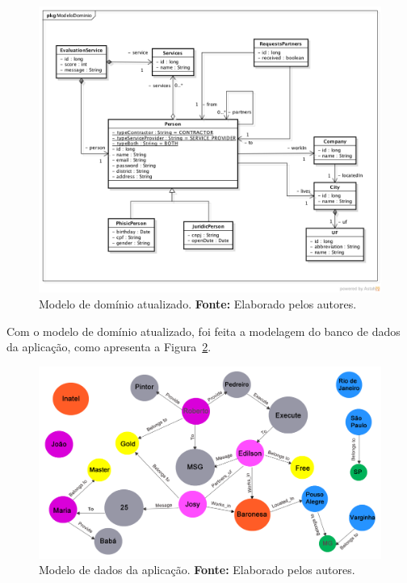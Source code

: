\newpage
\begin{figure}[h!]
	\centerline{\includegraphics[scale=0.5]{./imagens/modelo-dominio-com-atributos.png}}
	\caption[Modelo de domínio atualizado]
	{Modelo de domínio atualizado. \textbf{Fonte:} Elaborado pelos autores.}
	\label{fig:modelo_dominio_atualizado}
\end{figure}

Com o modelo de domínio atualizado, foi feita a modelagem do banco de dados da aplicação, como apresenta a Figura~\ref{fig:modelo_dados_aplicacao}.

\newpage
\begin{figure}[h!]
	\centerline{\includegraphics[scale=0.3]{./imagens/structure-all-nodes.png}}
	\caption[Modelo de dados da aplicação]
	{Modelo de dados da aplicação. \textbf{Fonte:} Elaborado pelos autores.}
	\label{fig:modelo_dados_aplicacao}
\end{figure} 

